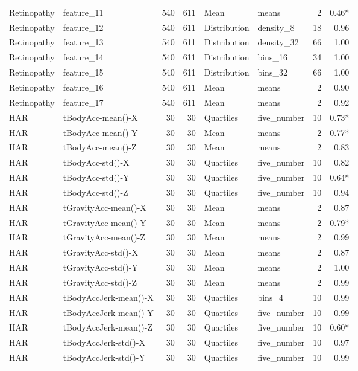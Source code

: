 \begin{longtable}{p{1.95cm}p{4.25cm}rrp{1.7cm}p{2.1cm}rr}
Retinopathy & feature\_11 & 540 & 611 & Mean & means & 2 & 0.46*\\
Retinopathy & feature\_12 & 540 & 611 & Distribution & density\_8 & 18 & 0.96\\
Retinopathy & feature\_13 & 540 & 611 & Distribution & density\_32 & 66 & 1.00\\
Retinopathy & feature\_14 & 540 & 611 & Distribution & bins\_16 & 34 & 1.00\\
Retinopathy & feature\_15 & 540 & 611 & Distribution & bins\_32 & 66 & 1.00\\
Retinopathy & feature\_16 & 540 & 611 & Mean & means & 2 & 0.90\\
Retinopathy & feature\_17 & 540 & 611 & Mean & means & 2 & 0.92\\
HAR & tBodyAcc-mean()-X & 30 & 30 & Quartiles & five\_number & 10 & 0.73*\\
HAR & tBodyAcc-mean()-Y & 30 & 30 & Mean & means & 2 & 0.77*\\
HAR & tBodyAcc-mean()-Z & 30 & 30 & Mean & means & 2 & 0.83\\
HAR & tBodyAcc-std()-X & 30 & 30 & Quartiles & five\_number & 10 & 0.82\\
HAR & tBodyAcc-std()-Y & 30 & 30 & Quartiles & five\_number & 10 & 0.64*\\
HAR & tBodyAcc-std()-Z & 30 & 30 & Quartiles & five\_number & 10 & 0.94\\
HAR & tGravityAcc-mean()-X & 30 & 30 & Mean & means & 2 & 0.87\\
HAR & tGravityAcc-mean()-Y & 30 & 30 & Mean & means & 2 & 0.79*\\
HAR & tGravityAcc-mean()-Z & 30 & 30 & Mean & means & 2 & 0.99\\
HAR & tGravityAcc-std()-X & 30 & 30 & Mean & means & 2 & 0.87\\
HAR & tGravityAcc-std()-Y & 30 & 30 & Mean & means & 2 & 1.00\\
HAR & tGravityAcc-std()-Z & 30 & 30 & Mean & means & 2 & 0.99\\
HAR & tBodyAccJerk-mean()-X & 30 & 30 & Quartiles & bins\_4 & 10 & 0.99\\
HAR & tBodyAccJerk-mean()-Y & 30 & 30 & Quartiles & five\_number & 10 & 0.99\\
HAR & tBodyAccJerk-mean()-Z & 30 & 30 & Quartiles & five\_number & 10 & 0.60*\\
HAR & tBodyAccJerk-std()-X & 30 & 30 & Quartiles & five\_number & 10 & 0.97\\
HAR & tBodyAccJerk-std()-Y & 30 & 30 & Quartiles & five\_number & 10 & 0.99\\

\end{longtable}
